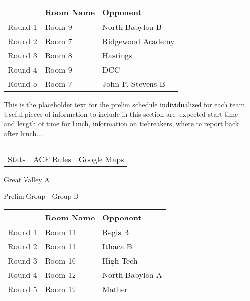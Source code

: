 \documentclass{article}%
\begin{document}
\vspace*{4pt}%
\begin{tabularx}{\textwidth}{|c|Y|Y|}%
\hline%
&Room Name&Opponent\\%
\hline%
Round 1&Room 9&North Babylon B\\%
Round 2&Room 7&Ridgewood Academy\\%
Round 3&Room 8&Hastings\\%
Round 4&Room 9&DCC\\%
Round 5&Room 7&John P. Stevens B\\%
\hline%
\end{tabularx}%
\vspace*{30pt}%
\linebreak%
This is the placeholder text for the prelim schedule individualized for each team. Useful pieces of information to include in this section are: expected start time and length of time for lunch, information on tiebreakers, where to report back after lunch...%
\vspace*{30pt}%
\newline%
%
\begin{tabularx}{\textwidth}{YYY}%
  &  &  \\%
\\%
Stats&ACF Rules&Google Maps\\%
\end{tabularx}%
\newpage%
%
\begin{center}%
\begin{Huge}%
Great Valley A%
\end{Huge}%
\vspace*{12pt}%
\linebreak%
\begin{Large}%
Prelim Group {-} Group D%
\end{Large}%
\end{center}%
\vspace*{4pt}%
\begin{tabularx}{\textwidth}{|c|Y|Y|}%
\hline%
&Room Name&Opponent\\%
\hline%
Round 1&Room 11&Regis B\\%
Round 2&Room 11&Ithaca B\\%
Round 3&Room 10&High Tech\\%
Round 4&Room 12&North Babylon A\\%
Round 5&Room 12&Mather\\%
\hline%
\end{tabularx}%
\end{document}
